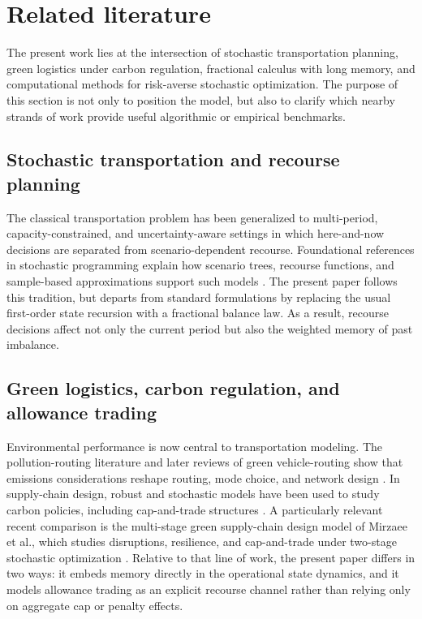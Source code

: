 \section{Related literature}
The present work lies at the intersection of stochastic transportation planning, green logistics under carbon regulation, fractional calculus with long memory, and computational methods for risk-averse stochastic optimization. The purpose of this section is not only to position the model, but also to clarify which nearby strands of work provide useful algorithmic or empirical benchmarks.

\subsection{Stochastic transportation and recourse planning}
The classical transportation problem has been generalized to multi-period, capacity-constrained, and uncertainty-aware settings in which here-and-now decisions are separated from scenario-dependent recourse. Foundational references in stochastic programming explain how scenario trees, recourse functions, and sample-based approximations support such models \cite{birge2011,shapiro2009}. The present paper follows this tradition, but departs from standard formulations by replacing the usual first-order state recursion with a fractional balance law. As a result, recourse decisions affect not only the current period but also the weighted memory of past imbalance.

\subsection{Green logistics, carbon regulation, and allowance trading}
Environmental performance is now central to transportation modeling. The pollution-routing literature and later reviews of green vehicle-routing show that emissions considerations reshape routing, mode choice, and network design \cite{bektas2011,asghari2021}. In supply-chain design, robust and stochastic models have been used to study carbon policies, including cap-and-trade structures \cite{homayouni2023carbon,qu2021}. A particularly relevant recent comparison is the multi-stage green supply-chain design model of Mirzaee et al., which studies disruptions, resilience, and cap-and-trade under two-stage stochastic optimization \cite{mirzaee2024green}. Relative to that line of work, the present paper differs in two ways: it embeds memory directly in the operational state dynamics, and it models allowance trading as an explicit recourse channel rather than relying only on aggregate cap or penalty effects.

